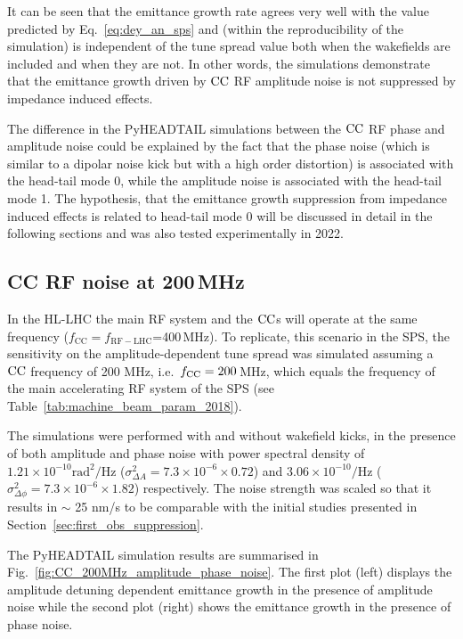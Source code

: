  It can be seen that the emittance growth rate agrees very well with the value predicted by Eq.~\eqref{eq:dey_an_sps} and (within the reproducibility of the simulation) is independent of the tune spread value both when the wakefields are included and when they are not. In other words, the simulations demonstrate that the emittance growth driven by ${\mathrm{CC}}$ RF amplitude noise is not suppressed by impedance induced effects. 

 The difference in the PyHEADTAIL simulations between the ${\mathrm{CC}}$ RF phase and amplitude noise could be explained by the fact that the phase noise (which is similar to a dipolar noise kick but with a high order distortion) is associated with the head-tail mode 0, while the amplitude noise is associated with the head-tail mode 1. The hypothesis, that the emittance growth suppression from impedance induced effects is related to head-tail mode 0 will be discussed in detail in the following sections and was also tested experimentally in 2022.


\subsection{CC RF noise at 200\,MHz}\label{subsec:fcc_200MHz}
In the HL-LHC the main RF system and the ${\mathrm{CC}}$s will operate at the same frequency ($f_\mathrm{CC}=f_\mathrm{RF-LHC}$=400\,MHz). To replicate, this scenario in the SPS, the sensitivity on the amplitude-dependent tune spread was simulated assuming a ${\mathrm{CC}}$ frequency of 200 MHz, i.e.~${f_\mathrm{CC}}=200$\,MHz, which equals the frequency of the main accelerating RF system of the SPS (see Table~\ref{tab:machine_beam_param_2018}). 

The simulations were performed with and without wakefield kicks, in the presence of both amplitude and phase noise with power spectral density of $1.21 \times 10^{-10} \mathrm{rad^2/Hz}$ ($\sigma_{\Delta A}^2=7.3 \times 10^{-6} \times 0.72$) and $3.06 \times 10^{-10} \mathrm{/Hz}$ ($\sigma_{\Delta \phi}^2=7.3 \times 10^{-6} \times 1.82$) respectively. The noise strength was scaled so that it results in $\sim$ 25 nm/s to be comparable with the initial studies presented in Section~\ref{sec:first_obs_suppression}.

The PyHEADTAIL simulation results are summarised in Fig.~\ref{fig:CC_200MHz_amplitude_phase_noise}. The first plot (left) displays the amplitude detuning dependent emittance growth in the presence of amplitude noise while the second plot (right) shows the emittance growth in the presence of phase noise. 

